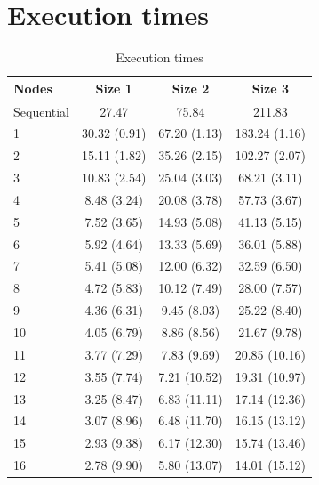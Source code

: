 \documentclass{article}
\begin{document}
\appendix

\section{Execution times}

\begin{table}[H]
\centering
\begin{tabular}{|l|c|c|c|}
\hline
Nodes & Size 1 & Size 2 & Size 3 \\ \hline
Sequential & 27.47 & 75.84 & 211.83 \\ \hline
1 & 30.32 (0.91) & 67.20 (1.13) & 183.24 (1.16) \\ \hline 
2 & 15.11 (1.82) & 35.26 (2.15) & 102.27 (2.07) \\ \hline 
3 & 10.83 (2.54) & 25.04 (3.03) & 68.21 (3.11) \\ \hline 
4 & 8.48 (3.24) & 20.08 (3.78) & 57.73 (3.67) \\ \hline 
5 & 7.52 (3.65) & 14.93 (5.08) & 41.13 (5.15) \\ \hline 
6 & 5.92 (4.64) & 13.33 (5.69) & 36.01 (5.88) \\ \hline 
7 & 5.41 (5.08) & 12.00 (6.32) & 32.59 (6.50) \\ \hline 
8 & 4.72 (5.83) & 10.12 (7.49) & 28.00 (7.57) \\ \hline 
9 & 4.36 (6.31) & 9.45 (8.03) & 25.22 (8.40) \\ \hline 
10 & 4.05 (6.79) & 8.86 (8.56) & 21.67 (9.78) \\ \hline 
11 & 3.77 (7.29) & 7.83 (9.69) & 20.85 (10.16) \\ \hline 
12 & 3.55 (7.74) & 7.21 (10.52) & 19.31 (10.97) \\ \hline 
13 & 3.25 (8.47) & 6.83 (11.11) & 17.14 (12.36) \\ \hline 
14 & 3.07 (8.96) & 6.48 (11.70) & 16.15 (13.12) \\ \hline 
15 & 2.93 (9.38) & 6.17 (12.30) & 15.74 (13.46) \\ \hline 
16 & 2.78 (9.90) & 5.80 (13.07) & 14.01 (15.12) \\ \hline 
\end{tabular}
\caption{Execution times} \label{tab:times}
\end{table}
\end{document}
